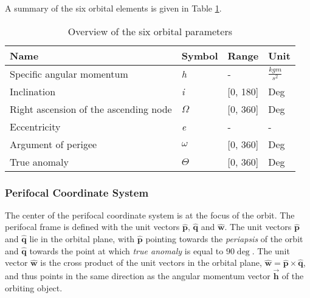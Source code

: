 A summary of the six orbital elements is given in Table \ref{table:orbital_parameters}. \\


\begin{table}[h]
\centering
\begin{tabular}{@{}llll@{}}
\toprule
Name                                  & Symbol              & Range     & Unit \\ \midrule
Specific angular momentum             & \textit{h}          & -         & $\frac{kgm}{s^2}$ \\
Inclination                           & \textit{i}          & [0, 180]  & Deg    \\
Right ascension of the ascending node & $\mathit{\Omega}$   & [0, 360]  & Deg  \\
Eccentricity                          & \textit{e}          & -         & -    \\
Argument of perigee                   & $\mathit{\omega}$   & [0, 360]  & Deg  \\
True anomaly                          & $\mathit{\Theta}$   & [0, 360]  & Deg  \\ \bottomrule
\end{tabular}
\caption{Overview of the six orbital parameters}
\label{table:orbital_parameters}
\end{table}


\subsubsection{Perifocal Coordinate System}

The center of the perifocal coordinate system is at the focus of the orbit. The perifocal frame is defined with the unit vectors $\hat{\mathbf{p}}$, $\hat{\mathbf{q}}$ and $\hat{\mathbf{w}}$. The unit vectors $\hat{\mathbf{p}}$ and $\hat{\mathbf{q}}$ lie in the orbital plane, with $\hat{\mathbf{p}}$ pointing towards the \textit{periapsis} of the orbit and $\hat{\mathbf{q}}$ towards the point at which \textit{true anomaly} is equal to $90 \deg$. The unit vector $\hat{\mathbf{w}}$ is the cross product of the unit vectors in the orbital plane, $\hat{\mathbf{w}} = \hat{\mathbf{p}} \times \hat{\mathbf{q}}$, and thus points in the same direction as the angular momentum vector $\Vec{\mathbf{h}}$ of the orbiting object. \\

